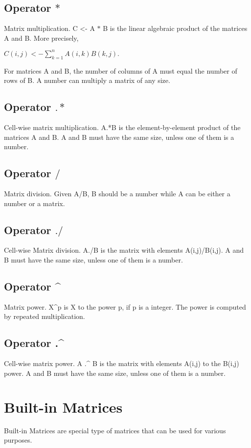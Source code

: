 \documentclass[prodmode,acmtecs]{acmsmall}
\begin{document}
\subsection{Operator $*$}
Matrix multiplication. C <- A $*$ B is the linear algebraic product of the
matrices A and B. More precisely,

$C(i,j) <- \displaystyle\sum\limits_{k=1}^n A(i,k)B(k,j).$

For matrices A and B, the number of columns of A must equal the number of
rows of B. A number can multiply a matrix of any size.
\medskip

\subsection{Operator $.*$}
Cell-wise matrix multiplication. A.*B is the element-by-element product
of the matrices A and B. A and B must have the same size, unless one of
them is a number.
\medskip

\subsection{Operator $/$}
Matrix division. Given A/B, B should be a number while A can be either a
number or a matrix.
\medskip

\subsection{Operator $./$}
Cell-wise Matrix division. A./B is the matrix with elements A(i,j)/B(i,j).
A and B must have the same size, unless one of them is a number.
\medskip

\subsection{Operator \^{}}
Matrix power. X\^{}p is X to the power p, if p is a integer. The power
is computed by repeated multiplication.
\medskip

\subsection{Operator .\^{}}
Cell-wise matrix power. A .\^{} B is the matrix with elements A(i,j) to
the B(i,j) power. A and B must have the same size, unless one of them
is a number.

\section{Built-in Matrices}
Built-in Matrices are special type of matrices that can be used for
various purposes.
\medskip
\end{document}
